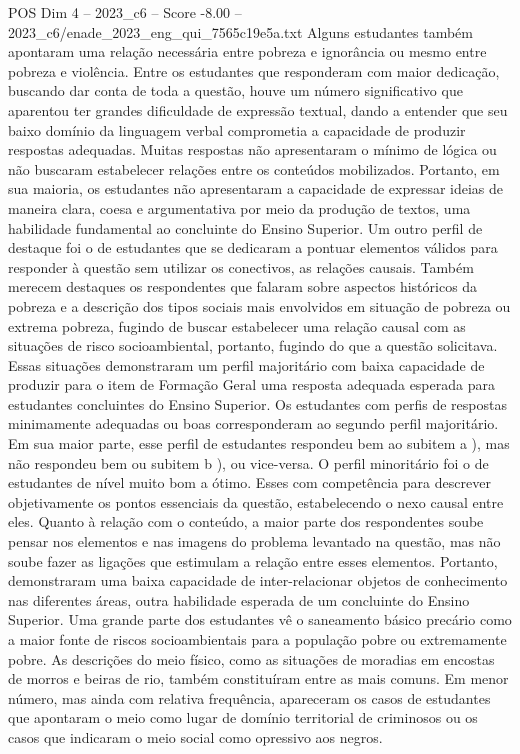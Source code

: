 \begin{textsample}{POS Dim 4 – 2023\_c6 – Score -8.00 – 2023\_c6/enade\_2023\_eng\_qui\_7565c19e5a.txt}
Alguns estudantes também apontaram uma relação necessária entre pobreza e ignorância ou mesmo entre pobreza e violência.
Entre os estudantes que responderam com maior dedicação, buscando dar conta de toda a questão, houve um número significativo que aparentou ter grandes dificuldade de expressão textual, dando a entender que seu baixo domínio da linguagem verbal comprometia a capacidade de produzir respostas adequadas.
Muitas respostas não apresentaram o mínimo de lógica ou não buscaram estabelecer relações entre os conteúdos mobilizados.
Portanto, em sua maioria, os estudantes não apresentaram a capacidade de expressar ideias de maneira clara, coesa e argumentativa por meio da produção de textos, uma habilidade fundamental ao concluinte do Ensino Superior.
Um outro perfil de destaque foi o de estudantes que se dedicaram a pontuar elementos válidos para responder à questão sem utilizar os conectivos, as relações causais.
Também merecem destaques os respondentes que falaram sobre aspectos históricos da pobreza e a descrição dos tipos sociais mais envolvidos em situação de pobreza ou extrema pobreza, fugindo de buscar estabelecer uma relação causal com as situações de risco socioambiental, portanto, fugindo do que a questão solicitava.
Essas situações demonstraram um perfil majoritário com baixa capacidade de produzir para o item de Formação Geral uma resposta adequada esperada para estudantes concluintes do Ensino Superior.
Os estudantes com perfis de respostas minimamente adequadas ou boas corresponderam ao segundo perfil majoritário.
Em sua maior parte, esse perfil de estudantes respondeu bem ao subitem a ), mas não respondeu bem ou subitem b ), ou vice-versa.
O perfil minoritário foi o de estudantes de nível muito bom a ótimo.
Esses com competência para descrever objetivamente os pontos essenciais da questão, estabelecendo o nexo causal entre eles.
Quanto à relação com o conteúdo, a maior parte dos respondentes soube pensar nos elementos e nas imagens do problema levantado na questão, mas não soube fazer as ligações que estimulam a relação entre esses elementos.
Portanto, demonstraram uma baixa capacidade de inter-relacionar objetos de conhecimento nas diferentes áreas, outra habilidade esperada de um concluinte do Ensino Superior.
Uma grande parte dos estudantes vê o saneamento básico precário como a maior fonte de riscos socioambientais para a população pobre ou extremamente pobre.
As descrições do meio físico, como as situações de moradias em encostas de morros e beiras de rio, também constituíram entre as mais comuns.
Em menor número, mas ainda com relativa frequência, apareceram os casos de estudantes que apontaram o meio como lugar de domínio territorial de criminosos ou os casos que indicaram o meio social como opressivo aos negros.

\end{textsample}

